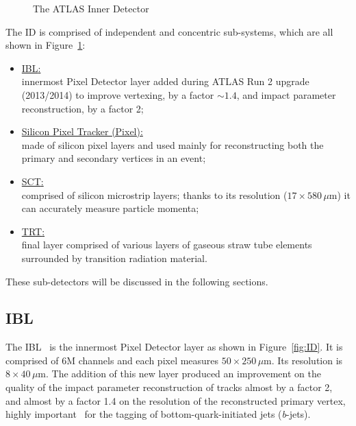 			\begin{figure}[!htb]
				\hfill
				\caption{The \ac{ATLAS} Inner Detector}
				\label{fig:AID}
			\end{figure}


			The \ac{ID} is comprised of independent and concentric sub-systems, which are all shown in Figure~\ref{fig:AID}: %

			\begin{itemize}
				\item \underline{\ac{IBL}:} \\innermost Pixel Detector layer added during \ac{ATLAS} Run 2 upgrade (2013/2014) to improve vertexing, by a factor $\sim 1.4$, and impact parameter reconstruction, by a factor 2;
				\item \underline{Silicon Pixel Tracker (Pixel):} \\made of silicon pixel layers and used mainly for reconstructing both the primary and secondary vertices in an event;
				\item \underline{\ac{SCT}:} \\comprised of silicon microstrip layers; thanks to its resolution ($17 \times 580\, \mu$m) it can accurately measure particle momenta;
				\item \underline{\ac{TRT}:} \\final layer comprised of various layers of gaseous straw tube elements surrounded by transition radiation material.
			\end{itemize}

			These sub-detectors will be discussed in the following sections.  

			\subsection*{IBL} 
				
				The \ac{IBL}~\cite{IBLTDR} is the innermost Pixel Detector layer as shown in Figure~\ref{fig:ID}. It is comprised of 6M channels and each pixel measures $50 \times 250\,\mu$m. Its resolution is $8 \times 40\, \mu$m. The addition of this new layer produced an improvement on the quality of the impact parameter reconstruction of tracks almost by a factor 2, and almost by a factor 1.4 on the resolution of the reconstructed primary vertex, highly important \eg\ for the tagging of bottom-quark-initiated jets (\emph{b}-jets). %

